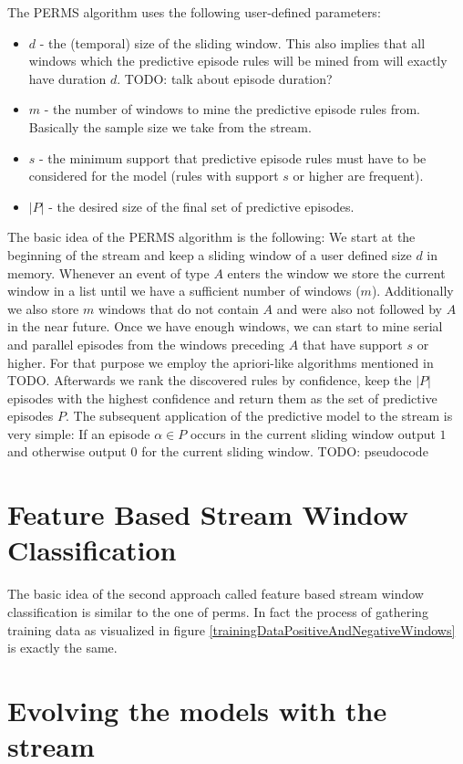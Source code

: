 The PERMS algorithm uses the following user-defined parameters:

\begin{itemize}
	\item \textbf{$d$} - the (temporal) size of the sliding window. This also implies that all windows which the predictive episode rules will be mined from will exactly have duration $d$. TODO: talk about episode duration?	
	\item \textbf{$m$} - the number of windows to mine the predictive episode rules from. Basically the sample size we take from the stream.
	\item \textbf{$s$} - the minimum support that predictive episode rules must have to be considered for the model (rules with support $s$ or higher are frequent).
	\item \textbf{$|P|$} - the desired size of the final set of predictive episodes.
\end{itemize}


The basic idea of the PERMS algorithm is the following:
We start at the beginning of the stream and keep a sliding window of a user defined size $d$ in memory. Whenever an event of type $A$ enters the window we store the current window in a list until we have a sufficient number of windows ($m$). Additionally we also store $m$ windows that do not contain $A$ and were also not followed by $A$ in the near future. Once we have enough windows, we can start to mine serial and parallel episodes from the windows preceding $A$ that have support $s$ or higher. For that purpose we employ the apriori-like algorithms mentioned in TODO. Afterwards we rank the discovered rules by confidence, keep the $|P|$ episodes with the highest confidence and return them as the set of predictive episodes $P$.
The subsequent application of the predictive model to the stream is very simple: If an episode $\alpha \in P$ occurs in the current sliding window output $1$ and otherwise output $0$ for the current sliding window.
TODO: pseudocode


\section{Feature Based Stream Window Classification}
\label{sec_FeatureBasedStreamWindowClassification}

The basic idea of the second approach called feature based stream window classification is similar to the one of perms. In fact the process of gathering training data as visualized in figure \ref{trainingDataPositiveAndNegativeWindows} is exactly the same. 


\section{Evolving the models with the stream}